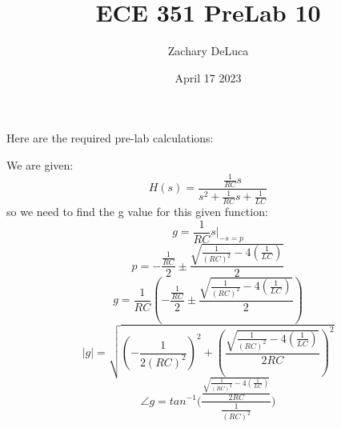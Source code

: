\documentclass[12pt,a4paper]{article}
\title{ECE 351 PreLab 10}
\author{Zachary DeLuca}
\date{April 17 2023}
\begin{document}
	\maketitle
	Here are the required pre-lab calculations: \vspace{12pt}
	\begin{center}
	We are given: 
	$$H(s)=\frac{\frac{1}{RC}s}{s^2+\frac{1}{RC}s+\frac{1}{LC}}$$
	so we need to find the g value for this given function: 
	$$g=\frac{1}{RC}s\bigg|_{-s=p}$$
	$$p = -\frac{\frac{1}{RC}}{2}\pm \frac{\sqrt{\frac{1}{(RC)^2}-4(\frac{1}{LC})}}{2}$$
	$$g=\frac{1}{RC}(-\frac{\frac{1}{RC}}{2}\pm \frac{\sqrt{\frac{1}{(RC)^2}-4(\frac{1}{LC})}}{2})$$
	$$|g|=\sqrt{(-\frac{1}{2(RC)^2})^2+(\frac{\sqrt{\frac{1}{(RC)^2}-4(\frac{1}{LC})}}{2RC})^2}$$
	$$\angle g = tan^{-1}\bigg(\frac{\frac{\sqrt{\frac{1}{(RC)^2}-4(\frac{1}{LC})}}{2RC}}{\frac{1}{(RC)^2}}\bigg)$$
	
	\end{center}
\end{document}
